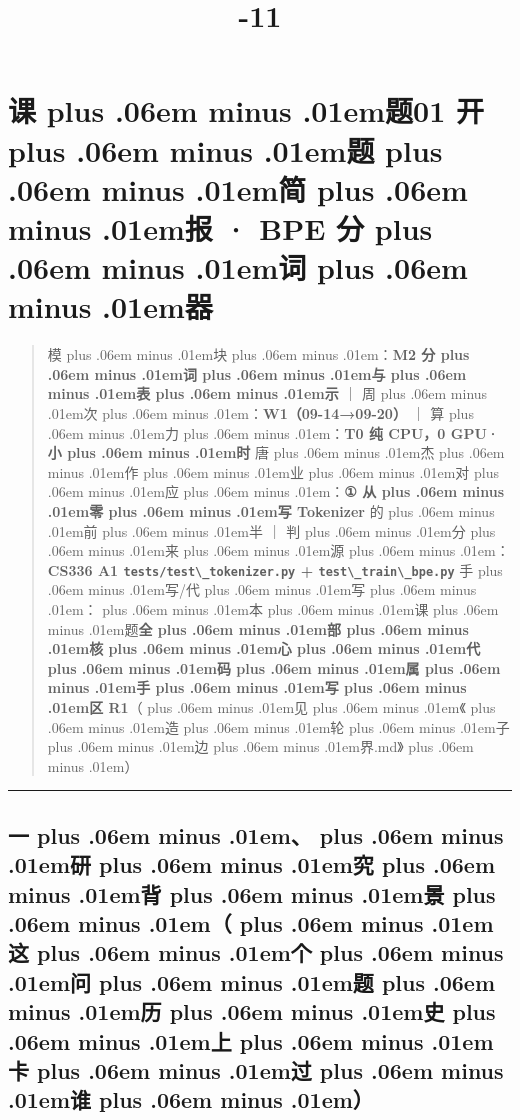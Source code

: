 \documentclass[
]{article}
\title{\zh{课\zhglue 题\zhglue 全\zhglue 集}-11\zh{个\zhglue 课\zhglue 题}}
\author{}
\date{}
\newcommand{\passthrough}[1]{#1}
\def\zh#1{{\zhfont #1}}
\def\sym#1{{\symfont #1}}
\def\zhglue{\hskip0pt plus .06em minus .01em}
\begin{document}
\maketitle

{
\setcounter{tocdepth}{2}
\tableofcontents
}
\section{\zh{课\zhglue 题}01 \zh{开\zhglue 题\zhglue 简\zhglue 报} \sym{·} BPE \zh{分\zhglue 词\zhglue 器}}\label{ux8bfeux989801-ux5f00ux9898ux7b80ux62a5-bpe-ux5206ux8bcdux5668}

\begin{quote}
\zh{模\zhglue 块\zhglue ：}\textbf{M2 \zh{分\zhglue 词\zhglue 与\zhglue 表\zhglue 示}} \zh{｜} \zh{周\zhglue 次\zhglue ：}\textbf{W1\zh{（}09-14\sym{→}09-20\zh{）}} \zh{｜} \zh{算\zhglue 力\zhglue ：}\textbf{T0 \zh{纯} CPU\zh{，}0 GPU\sym{·}\zh{小\zhglue 时}} \zh{唐\zhglue 杰\zhglue 作\zhglue 业\zhglue 对\zhglue 应\zhglue ：}\textbf{\sym{①} \zh{从\zhglue 零\zhglue 写} Tokenizer} \zh{的\zhglue 前\zhglue 半} \zh{｜} \zh{判\zhglue 分\zhglue 来\zhglue 源\zhglue ：}\textbf{CS336 A1 \passthrough{\lstinline!tests/test\_tokenizer.py!} + \passthrough{\lstinline!test\_train\_bpe.py!}} \zh{手\zhglue 写}/\zh{代\zhglue 写\zhglue ：\zhglue 本\zhglue 课\zhglue 题}\textbf{\zh{全\zhglue 部\zhglue 核\zhglue 心\zhglue 代\zhglue 码\zhglue 属\zhglue 手\zhglue 写\zhglue 区} R1}\zh{（\zhglue 见\zhglue 《\zhglue 造\zhglue 轮\zhglue 子\zhglue 边\zhglue 界}.md\zh{》\zhglue ）}
\end{quote}

\begin{center}\rule{0.5\linewidth}{0.5pt}\end{center}

\subsection{\zh{一\zhglue 、\zhglue 研\zhglue 究\zhglue 背\zhglue 景\zhglue （\zhglue 这\zhglue 个\zhglue 问\zhglue 题\zhglue 历\zhglue 史\zhglue 上\zhglue 卡\zhglue 过\zhglue 谁\zhglue ）}}\label{ux4e00ux7814ux7a76ux80ccux666fux8fd9ux4e2aux95eeux9898ux5386ux53f2ux4e0aux5361ux8fc7ux8c01}
\end{document}
